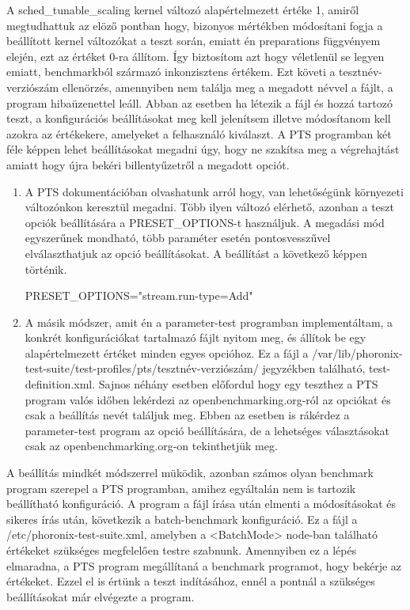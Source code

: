 A sched\_tunable\_scaling kernel változó alapértelmezett értéke 1, amiről megtudhattuk az elöző pontban hogy, bizonyos mértékben módosítani fogja a beállított kernel változókat a teszt során, emiatt én preparations függvényem elején, ezt az értéket 0-ra állítom. Így biztosítom azt hogy véletlenül se legyen emiatt, benchmarkból származó inkonzisztens értékem.
Ezt követi a tesztnév-verziószám ellenörzés, amennyiben nem találja meg a megadott névvel a fájlt, a program hibaüzenettel leáll.
Abban az esetben ha létezik a fájl és hozzá tartozó teszt, a konfigurációs beállításokat meg kell jelenítsem illetve módosítanom kell azokra az értékekere, amelyeket a felhasználó kiválaszt.
A PTS programban két féle képpen lehet beállításokat megadni úgy, hogy ne szakítsa meg a végrehajtást amiatt hogy újra bekéri billentyűzetről a megadott opciót.
\begin{enumerate}
\item A PTS dokumentációban olvashatunk arról hogy, van lehetőségünk környezeti változónkon keresztül megadni. Több ilyen változó elérhető, azonban a teszt opciók beállítására a PRESET\_OPTIONS-t használjuk. A megadási mód egyszerűnek mondható, több paraméter esetén pontosvesszűvel elválaszthatjuk az opció beállításokat. A beállítást a következő képpen történik.

PRESET\_OPTIONS="stream.run-type=Add" 
\item A másik módszer, amit én a parameter-test programban implementáltam, a konkrét konfigurációkat tartalmazó fájlt nyitom meg, és állítok be egy alapértelmezett értéket minden egyes opcióhoz. Ez a fájl a /var/lib/phoronix-test-suite/test-profiles/pts/tesztnév-verziószám/ jegyzékben található, test-definition.xml. Sajnos néhány esetben előfordul hogy egy teszthez a PTS program valós időben lekérdezi az openbenchmarking.org-ról az opciókat és csak a beállítás nevét találjuk meg. Ebben az esetben is rákérdez a parameter-test program az opció beállítására, de a lehetséges választásokat csak az openbenchmarking.org-on tekinthetjük meg. 
\end{enumerate}
A beállítás mindkét módszerrel müködik, azonban számos olyan benchmark program szerepel a PTS programban, amihez egyáltalán nem is tartozik beállítható konfiguráció. A program a fájl írása után elmenti a módosításokat és sikeres írás után, következik a batch-benchmark konfiguráció. 
Ez a fájl a /etc/phoronix-test-suite.xml, amelyben a <BatchMode> node-ban található értékeket szükséges megfelelően testre szabnunk. Amennyiben ez a lépés elmaradna, a PTS program megállítaná a benchmark programot, hogy bekérje az értékeket. Ezzel el is értünk a teszt indításához, ennél a pontnál a szükséges beállításokat már elvégezte a program.
